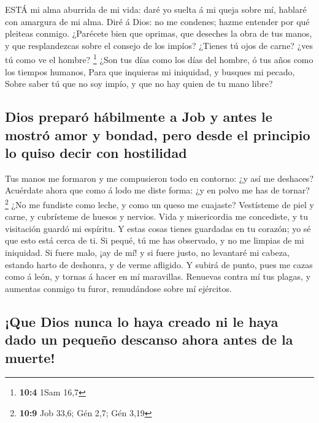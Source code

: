  ESTÁ mi alma aburrida de mi vida: daré yo suelta á mi queja
sobre mí, hablaré con amargura de mi alma.  Diré á Dios: no
me condenes; hazme entender por qué pleiteas conmigo. 
¿Parécete bien que oprimas, que deseches la obra de tus manos, y que
resplandezcas sobre el consejo de los impíos?  ¿Tienes tú
ojos de carne? ¿ves tú como ve el hombre? \footnote{\textbf{10:4} 1Sam
  16,7}  ¿Son tus días como los días del hombre, ó tus años
como los tiempos humanos,  Para que inquieras mi iniquidad,
y busques mi pecado,  Sobre saber tú que no soy impío, y que
no hay quien de tu mano libre?

\hypertarget{dios-preparuxf3-huxe1bilmente-a-job-y-antes-le-mostruxf3-amor-y-bondad-pero-desde-el-principio-lo-quiso-decir-con-hostilidad}{%
\subsection{Dios preparó hábilmente a Job y antes le mostró amor y
bondad, pero desde el principio lo quiso decir con
hostilidad}\label{dios-preparuxf3-huxe1bilmente-a-job-y-antes-le-mostruxf3-amor-y-bondad-pero-desde-el-principio-lo-quiso-decir-con-hostilidad}}

 Tus manos me formaron y me compusieron todo en contorno: ¿y
así me deshaces?  Acuérdate ahora que como á lodo me diste
forma: ¿y en polvo me has de tornar? \footnote{\textbf{10:9} Job 33,6;
  Gén 2,7; Gén 3,19}  ¿No me fundiste como leche, y como un
queso me cuajaste?  Vestísteme de piel y carne, y
cubrísteme de huesos y nervios.  Vida y misericordia me
concediste, y tu visitación guardó mi espíritu.  Y estas
cosas tienes guardadas en tu corazón; yo sé que esto está cerca de ti.
 Si pequé, tú me has observado, y no me limpias de mi
iniquidad.  Si fuere malo, ¡ay de mí! y si fuere justo, no
levantaré mi cabeza, estando harto de deshonra, y de verme afligido.
 Y subirá de punto, pues me cazas como á león, y tornas á
hacer en mí maravillas.  Renuevas contra mí tus plagas, y
aumentas conmigo tu furor, remudándose sobre mí ejércitos.

\hypertarget{que-dios-nunca-lo-haya-creado-ni-le-haya-dado-un-pequeuxf1o-descanso-ahora-antes-de-la-muerte}{%
\subsection{¡Que Dios nunca lo haya creado ni le haya dado un pequeño
descanso ahora antes de la
muerte!}\label{que-dios-nunca-lo-haya-creado-ni-le-haya-dado-un-pequeuxf1o-descanso-ahora-antes-de-la-muerte}}

